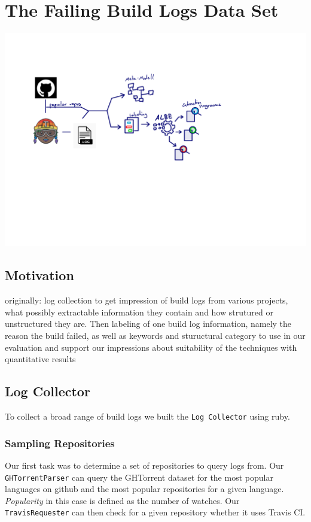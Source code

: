 \documentclass[\myrootdir/main.tex]{subfiles}
\begin{document}
\chapter{The Failing Build Logs Data Set}
\includegraphics[page=5, width=\textwidth, trim={0.5cm 0.5cm 0.5cm 0.5cm}, clip]{img/flow-of-research.pdf}

\label{data-set}
\section{Motivation}
originally: log collection to get impression of build logs from various projects, what possibly extractable information they contain and how strutured or unstructured they are.
Then labeling of one build log information, namely the reason the build failed, as well as keywords and stuructural category to use in our evaluation and support our impressions about suitability of the techniques with quantitative results

\section{Log Collector}
To collect a broad range of build logs we built the \texttt{Log Collector} using ruby.

  \subsection{Sampling Repositories}
  Our first task was to determine a set of repositories to query logs from. Our \texttt{GHTorrentParser} can query the GHTorrent dataset for the most popular languages on github and the most popular repositories for a given language. \emph{Popularity} in this case is defined as the number of watches. Our \texttt{TravisRequester} can then check for a given repository whether it uses Travis CI.
\end{document}
